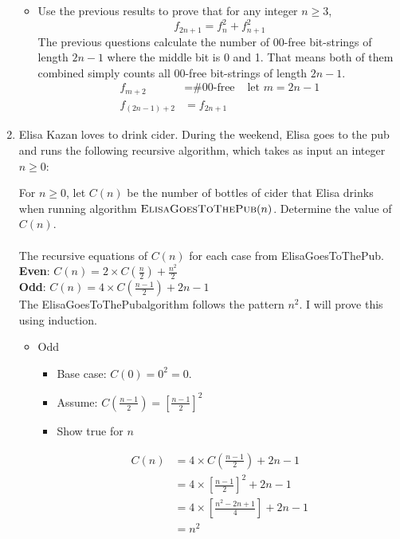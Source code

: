 \documentclass{article}
\newcommand{\EGTTP}{\textsf{\sc ElisaGoesToThePub}}
\begin{document}
\begin{enumerate}
\begin{itemize}
				\item
					Use the previous results to prove that for any integer $n \geq 3$,
					\[
						f_{2n+1} = f_n^2 + f_{n+1}^2 
					\]
					The previous questions calculate the number of 00-free bit-strings of length $2n - 1$ where the middle bit is 0 and 1. That means both of them combined simply counts all 00-free bit-strings of length $2n - 1$. \\
					\begin{align*}
						 f_{m + 2}&= \text{\#00-free}&\text{ let }m = 2n - 1 \\
						f_{(2n - 1) + 2} &= f_{2n + 1}&
					\end{align*}
			\end{itemize}
		\item %
			Elisa Kazan loves to drink cider. During the weekend, Elisa goes to the pub and runs the following recursive algorithm, which takes as input an integer $n \geq 0$:
			
			For $n \geq 0$, let $C(n)$ be the number of bottles of cider that Elisa drinks when running algorithm $\EGTTP(n)$. Determine the value of $C(n)$. \\
			\\
			The recursive equations of $C(n)$ for each case from \EGTTP. \\
			\textbf{Even}: $C(n) = 2 \times C(\frac{n}{2}) + \frac{n^2}{2}$ \\
			\textbf{Odd}: $C(n) = 4 \times C(\frac{n - 1}{2}) + 2n - 1$ \\
			The \EGTTP\text{ }algorithm follows the pattern $n^2$. I will prove this using induction. \\
			\begin{itemize}
				\item Odd
					\begin{itemize}
						\item Base case: $C(0) = 0^2 = 0.$
						\item Assume: $C(\frac{n - 1}{2}) = \left[\frac{n - 1}{2}\right]^2$
						\item Show true for $n$
					\end{itemize}

					\begin{align*}
						C(n) &= 4 \times C\left(\frac{n - 1}{2}\right) + 2n - 1 \\
						&= 4 \times \left[\frac{n - 1}{2}\right]^2 + 2n - 1 \\
						&= 4 \times \left[\frac{n^2 - 2n + 1}{4}\right] + 2n - 1 \\
						&= n^2 
					\end{align*}
					

\end{itemize}
\end{enumerate}
\end{document}
